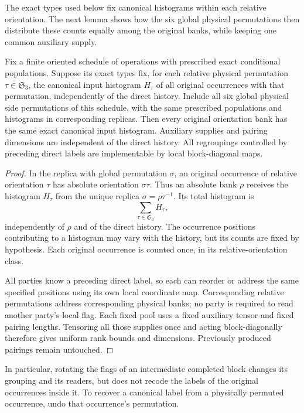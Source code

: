 The exact types used below fix canonical histograms within each relative
orientation.  The next lemma shows how the six global physical permutations
then distribute these counts equally among the original banks, while
keeping one common auxiliary supply.

\begin{lemma}
\label{alg:orientation-banks}
Fix a finite oriented schedule of operations with prescribed exact
conditional populations.  Suppose its exact types fix, for each relative
physical permutation \(\tau\in\mathfrak S_3\), the canonical input
histogram \(H_\tau\) of all original occurrences with that permutation,
independently of the direct history.  Include all six global physical side
permutations of this schedule, with the same prescribed populations and
histograms in corresponding replicas.
Then every original orientation bank has the same exact canonical input
histogram.  Auxiliary supplies and pairing dimensions are independent of
the direct history.  All regroupings controlled by preceding direct labels
are implementable by local block-diagonal maps.
\end{lemma}
\begin{proof}
In the replica with global permutation \(\sigma\), an original occurrence
of relative orientation \(\tau\) has absolute orientation
\(\sigma\tau\).  Thus an absolute bank \(\rho\) receives the histogram
\(H_\tau\) from the unique replica
\(\sigma=\rho\tau^{-1}\).  Its total histogram is
\[
 \sum_{\tau\in\mathfrak S_3}H_\tau,
\]
independently of \(\rho\) and of the direct history.  The occurrence
positions contributing to a histogram may vary with the history, but its
counts are fixed by hypothesis.  Each original occurrence is counted once,
in its relative-orientation class.

All parties know a preceding direct label, so each can reorder or address
the same specified positions using its own local coordinate map.
Corresponding relative permutations address corresponding physical banks;
no party is required to read another party's local flag.  Each fixed pool
uses a fixed auxiliary tensor and fixed pairing lengths.  Tensoring all
those supplies once and acting block-diagonally therefore gives uniform
rank bounds and dimensions.  Previously produced pairings remain untouched.
\end{proof}

In particular, rotating the flags of an intermediate completed block
changes its grouping and its readers, but does not recode the labels of
the original occurrences inside it.  To recover a canonical label from a
physically permuted occurrence, undo that occurrence's permutation.

